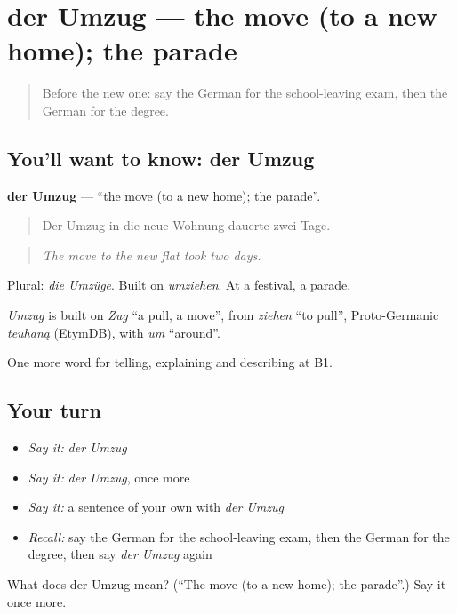 \section[der Umzug]{der Umzug — the move (to a new home); the parade}

\label{lesson:GE-C297-umzug}



\begin{quote}
Before the new one: say the German for the school-leaving exam, then the German for the degree.
\end{quote}

\subsection*{You'll want to know: der Umzug}
\textbf{der Umzug} — \textquotedblleft{}the move (to a new home); the parade\textquotedblright{}.

\begin{quote}
Der Umzug in die neue Wohnung dauerte zwei Tage.
\end{quote}

\begin{quote}
\emph{The move to the new flat took two days.}
\end{quote}

Plural: \emph{die Umzüge}. Built on \emph{umziehen}. At a festival, a parade.

\begin{cousinweb}
\emph{Umzug} is built on \emph{Zug} \textquotedblleft{}a pull, a move\textquotedblright{}, from \emph{ziehen} \textquotedblleft{}to pull\textquotedblright{}, Proto-Germanic \emph{teuhaną} (EtymDB), with \emph{um} \textquotedblleft{}around\textquotedblright{}.
\end{cousinweb}

\begin{grammarlens}[title={What you've built}]
One more word for telling, explaining and describing at B1.
\end{grammarlens}

\subsection*{Your turn}
\begin{itemize}
\raggedright
  \item \emph{Say it:} \emph{der Umzug}
  \item \emph{Say it:} \emph{der Umzug}, once more
  \item \emph{Say it:} a sentence of your own with \emph{der Umzug}
  \item \emph{Recall:} say the German for the school-leaving exam, then the German for the degree, then say \emph{der Umzug} again
\end{itemize}

\begin{tcolorbox}[breakable,colback=teal!4,colframe=teal!35!black,title={Before you move on}]
What does der Umzug mean? (\textquotedblleft{}The move (to a new home); the parade\textquotedblright{}.) Say it once more.
\end{tcolorbox}
